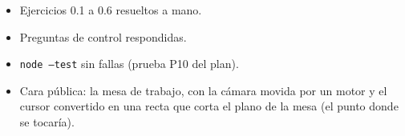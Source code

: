 \documentclass[11pt,a4paper]{article}
\numberwithin{equation}{section}
\begin{document}
\begin{tcolorbox}[colback=verde!6,colframe=verde,title={\faFlagCheckered~Cierre del módulo 0},fonttitle=\bfseries]
\begin{itemize}[leftmargin=*]
  \item Ejercicios 0.1 a 0.6 resueltos a mano.
  \item Preguntas de control respondidas.
  \item \texttt{node --test} sin fallas (prueba P10 del plan).
  \item Cara pública: la mesa de trabajo, con la cámara movida por un motor y el cursor convertido en una recta que
        corta el plano de la mesa (el punto donde se tocaría).
\end{itemize}
\end{tcolorbox}
\end{document}
